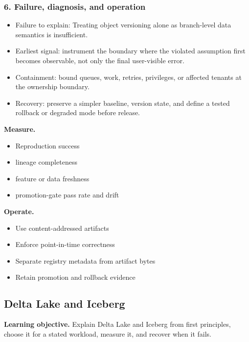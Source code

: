 \subsubsection*{6. Failure, diagnosis, and operation}
\begin{itemize}
\item Failure to explain: Treating object versioning alone as branch-level data semantics is insufficient.
\item Earliest signal: instrument the boundary where the violated assumption first becomes observable, not only the final user-visible error.
\item Containment: bound queues, work, retries, privileges, or affected tenants at the ownership boundary.
\item Recovery: preserve a simpler baseline, version state, and define a tested rollback or degraded mode before release.
\end{itemize}
\textbf{Measure.}\begin{itemize}
\item Reproduction success
\item lineage completeness
\item feature or data freshness
\item promotion-gate pass rate and drift
\end{itemize}
\textbf{Operate.}\begin{itemize}
\item Use content-addressed artifacts
\item Enforce point-in-time correctness
\item Separate registry metadata from artifact bytes
\item Retain promotion and rollback evidence
\end{itemize}
\subsection{Delta Lake and Iceberg}
\textbf{Learning objective.} Explain Delta Lake and Iceberg from first principles, choose it for a stated workload, measure it, and recover when it fails.
